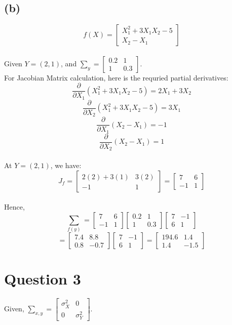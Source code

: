 \documentclass{article}
\begin{document}
\subsection*{(b)}
\[ f(X) = \begin{bmatrix} X_1^2 + 3X_1X_2 - 5 \\ X_2 - X_1 \end{bmatrix} \]
\\
Given $Y = (2,1)$, and $\sum_y = \begin{bmatrix} 0.2 & 1 \\ 1 & 0.3 \end{bmatrix}$.
\\
For Jacobian Matrix calculation, here is the requried partial derivatives:
\[ \frac{\partial}{\partial X_1} (X_1^2 + 3X_1X_2 - 5) = 2X_1 + 3X_2 \]
\[ \frac{\partial}{\partial X_2} (X_1^2 + 3X_1X_2 - 5) = 3X_1 \]
\[ \frac{\partial}{\partial X_1} (X_2 - X_1) = -1 \]
\[ \frac{\partial}{\partial X_2} (X_2 - X_1) = 1 \]
\\
At $Y = (2,1)$, we have:
\[ J_f= \begin{bmatrix} 2(2) + 3(1) & 3(2) \\ -1 & 1 \end{bmatrix} = \begin{bmatrix} 7 & 6 \\ -1 & 1 \end{bmatrix} \]
\\
Hence,
\[ \sum_{f(y)} = \begin{bmatrix} 7 & 6 \\ -1 & 1 \end{bmatrix} \begin{bmatrix} 0.2 & 1 \\ 1 & 0.3 \end{bmatrix} \begin{bmatrix} 7 & -1 \\ 6 & 1 \end{bmatrix} \]
\[ = \begin{bmatrix} 7.4 & 8.8 \\ 0.8 & -0.7 \end{bmatrix} \begin{bmatrix} 7 & -1 \\ 6 & 1 \end{bmatrix} = \begin{bmatrix} 194.6 & 1.4 \\ 1.4 & -1.5 \end{bmatrix} \]

\section*{Question 3}
Given, $\sum_{x,y} = \begin{bmatrix} \sigma^2_X & 0 \\ 0 & \sigma^2_Y \end{bmatrix}$.
\end{document}
